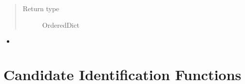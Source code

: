\documentclass[letterpaper,10pt,english]{sphinxmanual}
\begin{document}
\begin{fulllineitems}
\begin{quote}
\begin{description}
\item[{Return type}] \leavevmode
OrderedDict

\end{description}\end{quote}



\begin{itemize}
\item {} 
{\hyperref[\detokenize{functions:pyresid.locate_residues}]{}}

\end{itemize}



\end{fulllineitems}



\chapter{Candidate Identification Functions}
\label{\detokenize{functions:candidate-identification-functions}}
\end{document}
